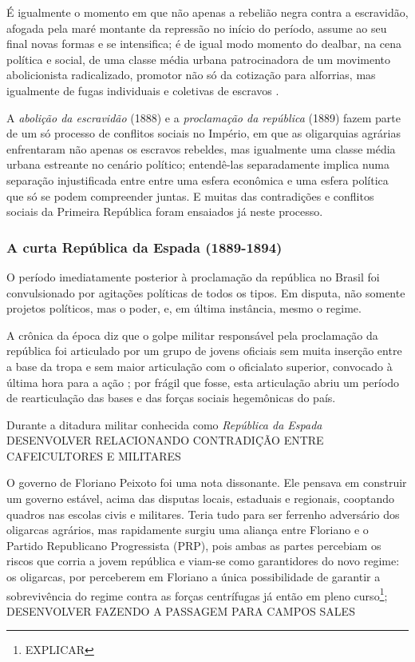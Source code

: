 É igualmente o momento em que não apenas a rebelião negra contra a escravidão, afogada pela maré montante da repressão no início do período, assume ao seu final novas formas e se intensifica; é de igual modo momento do dealbar, na cena política e social, de uma classe média urbana patrocinadora de um movimento abolicionista radicalizado, promotor não só da cotização para alforrias, mas igualmente de fugas individuais e coletivas de escravos \cite[p.~267-336]{saes_estadoburgues_1985}.

A \textit{abolição da escravidão} (1888) e a \textit{proclamação da república} (1889) fazem parte de um só processo de conflitos sociais no Império, em que as oligarquias agrárias enfrentaram não apenas os escravos rebeldes, mas igualmente uma classe média urbana estreante no cenário político; entendê-las separadamente implica numa separação injustificada entre entre uma esfera econômica e uma esfera política que só se podem compreender juntas. E muitas das contradições e conflitos sociais da Primeira República foram ensaiados já neste processo.

\subsubsection{A curta República da Espada (1889-1894)}\label{subsubsec:espada}

O período imediatamente posterior à proclamação da república no Brasil foi convulsionado por agitações políticas de todos os tipos. Em disputa, não somente projetos políticos, mas o poder, e, em última instância, mesmo o regime.

A crônica da época diz que o golpe militar responsável pela proclamação da república foi articulado por um grupo de jovens oficiais sem muita inserção entre a base da tropa e sem maior articulação com o oficialato superior, convocado à última hora para a ação \cite[p.~16]{cardoso_govmil_1977}; por frágil que fosse, esta articulação abriu um período de rearticulação das bases e das forças sociais hegemônicas do país. 

Durante a ditadura militar conhecida como \textit{República da Espada} DESENVOLVER RELACIONANDO CONTRADIÇÃO ENTRE CAFEICULTORES E MILITARES

O governo de Floriano Peixoto foi uma nota dissonante. Ele pensava em construir um governo estável, acima das disputas locais, estaduais e regionais, cooptando quadros nas escolas civis e militares. Teria tudo para ser ferrenho adversário dos oligarcas agrários, mas rapidamente surgiu uma aliança entre Floriano e o Partido Republicano Progressista (PRP), pois ambas as partes percebiam os riscos que corria a jovem república e viam-se como garantidores do novo regime: os oligarcas, por perceberem em Floriano a única possibilidade de garantir a sobrevivência do regime contra as forças centrífugas já então em pleno curso\footnote{EXPLICAR}; DESENVOLVER FAZENDO A PASSAGEM PARA CAMPOS SALES

